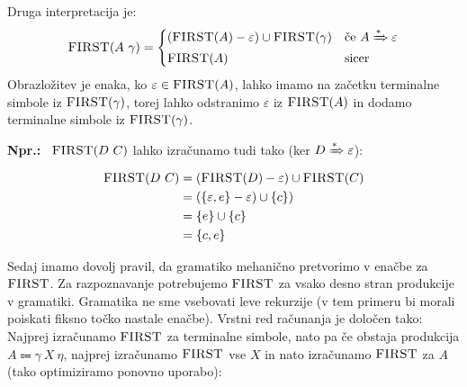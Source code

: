 \documentclass{article}
\newcommand{\Ex}{\textbf{Npr.:}\ }
\newcommand{\FIRST}{\textsc{FIRST}}
\newcommand{\Null}{\varepsilon}
\newcommand{\Arrow}{\Coloneqq}
\newcommand{\DeriveStar}{\xRightarrow{\ast}}
\newcommand{\Seq}{\ }
\begin{document}
Druga interpretacija je:
\begin{equation*}
  \FIRST(A \Seq \gamma) = \begin{cases}
    (\FIRST(A) - \Null) \cup \FIRST(\gamma) & \text{če } A \DeriveStar \Null \\
    \FIRST(A) & \text{sicer} \\
  \end{cases}
\end{equation*}
Obrazložitev je enaka, ko $\Null \in \FIRST(A)$, lahko imamo na začetku terminalne simbole iz $\FIRST(\gamma)$, torej lahko odstranimo $\Null$ iz $\FIRST(A)$ in dodamo terminalne simbole iz $\FIRST(\gamma)$.

\Ex
  $\FIRST(D \Seq C)$ lahko izračunamo tudi tako (ker $D \DeriveStar \Null$):
  \begin{equation*}
    \begin{aligned}
      \FIRST(D \Seq C) &= (\FIRST(D) - \Null) \cup \FIRST(C)\\
                &= (\{\Null, e\} - \Null) \cup \{c\})\\
                &= \{e\} \cup \{c\}\\
                &= \{c, e\}
    \end{aligned}
  \end{equation*}

Sedaj imamo dovolj pravil, da gramatiko mehanično pretvorimo v enačbe za $\FIRST$.
Za razpoznavanje potrebujemo $\FIRST$ za vsako desno stran produkcije v gramatiki.
Gramatika ne sme vsebovati leve rekurzije (v tem primeru bi morali poiskati fiksno točko nastale enačbe).
Vrstni red računanja je določen tako: Najprej izračunamo $\FIRST$ za terminalne simbole, nato pa če obstaja produkcija ${A \Arrow \gamma \Seq X \Seq \eta}$, najprej izračunamo $\FIRST$ vse $X$ in nato izračunamo $\FIRST$ za $A$ (tako optimiziramo ponovno uporabo):
\end{document}
